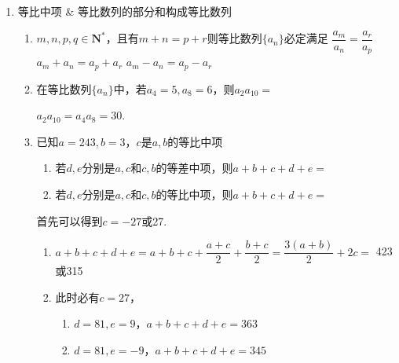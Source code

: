 \begin{enumerate}
\begin{enumerate}
        \item 已知等比数列$\{a_n\}$的公比$q>1$，第19项的平方等于第26项，则使得$a_1 + a_2 + \cdots + a_n > \dfrac{1}{a_1} + \dfrac{1}{a_2} + \cdots + \dfrac{1}{a_n}$成立的$n$的范围是
        \begin{jieda}
            因为$q > 1$，所以$\{a_n\}$是递增数列，故当$n$大于某值后该不等式必然恒成立. \\
            $(a_1 \cdot q^{18})^2 = (a_1 \cdot q^{25})$，故$a_1 = \dfrac{1}{q^{11}}$，故$a_{12} = 1$，故$a_1 + a_2 + \cdots + a_{23} = \dfrac{1}{a_1} + \dfrac{1}{a_2} + \cdots + \dfrac{1}{a_{23}}$，因此当$n \geq 24$时不等式恒成立.
        \end{jieda}
    \end{enumerate}
    \item 等比中项 \& 等比数列的部分和构成等比数列 
    \begin{enumerate}
    \item $m,n,p,q \in \mathbf{N^*}$，且有$m+n = p+r$则等比数列$\{a_n\}$必定满足
    {$\dfrac{a_m}{a_n} = \dfrac{a_r}{a_p}$}
    {$a_m + a_n = a_p + a_r$}
    {$a_m- a_n = a_p- a_r$}
    \item 在等比数列$\{a_n\}$中，若$a_4 = 5, a_8 = 6$，则$a_2 a_{10} = $
    \begin{jieda}
        $a_2 a_{10} = a_4 a_8 = 30$.
    \end{jieda}
    \item 已知$a = 243, b = 3$，$c$是$a, b$的等比中项
    \begin{enumerate}
        \item 若$d, e$分别是$a, c$和$c, b$的等差中项，则$a+b+c+d+e = $
        \item 若$d, e$分别是$a, c$和$c, b$的等比中项，则$a+b+c+d+e = $
    \end{enumerate}
    \begin{jieda}
        首先可以得到$c = -27$或27.
        \begin{enumerate}
            \item $a+b+c+d+e = a+b+c + \dfrac{a+c}{2} + \dfrac{b+c}{2} = \dfrac{3(a+b)}{2} + 2c = $ 423或315
            \item 此时必有$c = 27$，\begin{enumerate}[1.]
                \item $d = 81, e = 9$，$a+b+c+d+e = 363$
                \item $d = 81, e = -9$，$a+b+c+d+e = 345$

\end{enumerate}
\end{enumerate}
\end{jieda}
\end{enumerate}
\end{enumerate}
